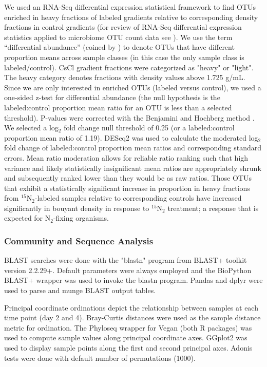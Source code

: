 We used an RNA-Seq differential expression statistical framework
\citep{Love_2014} to find OTUs enriched in heavy fractions of labeled
gradients relative to corresponding density fractions in control gradients
(for review of RNA-Seq differential expression statistics applied to
microbiome OTU count data see \citet{24699258}). We use the term
“differential abundance” (coined by \citet{24699258}) to denote OTUs that
have different proportion means across sample classes (in this case the only
sample class is labeled/control).  CsCl gradient fractions were categorized
as "heavy" or "light". The heavy category denotes fractions with density
values above 1.725 g/mL. Since we are only interested in enriched OTUs
(labeled versus control), we used a one-sided z-test for differential
abundance (the null hypothesis is the labeled:control proportion mean ratio
for an OTU is less than a selected threshold). P-values were corrected with
the Benjamini and Hochberg method \citep{citeulike:1042553}. We selected a
log$_{2}$ fold change null threshold of 0.25 (or a labeled:control proportion
mean ratio of 1.19). DESeq2 was used to calculate the moderated log$_{2}$
fold change of labeled:control proportion mean ratios and corresponding
standard errors. Mean ratio moderation allows for reliable ratio ranking such
that high variance and likely statistically insignificant mean ratios are
appropriately shrunk and subsequently ranked lower than they would be as raw
ratios. Those OTUs that exhibit a statistically significant increase in
proportion in heavy fractions from $^{15}$N$_{2}$-labeled samples relative to
corresponding controls have increased significantly in bouyant density in
response to $^{15}$N$_{2}$ treatment; a response that is expected for
N$_{2}$-fixing organisms.

\subsubsection{Community and Sequence Analysis}
BLAST searches were done with the "blastn" program from BLAST+ toolkit
\citep{20003500} version 2.2.29+. Default parameters were always employed and
the BioPython \citep{19304878} BLAST+ wrapper was used to invoke the blastn
program. Pandas \citep{citeulike:11241428} and dplyr \citep{dplyr} were used to
parse and munge BLAST output tables.  

Principal coordinate ordinations depict the relationship between
samples at each time point (day 2 and 4). Bray-Curtis distances were
used as the sample distance metric for ordination. The Phyloseq
\citep{24699258} wrapper for Vegan \citep{vegan} (both R packages) was
used to compute sample values along principal coordinate axes. GGplot2
\citep{ggplot2} was used to display sample points along the first and
second principal axes. Adonis tests \cite{Anderson_2001} were done with default
number of permutations (1000).

